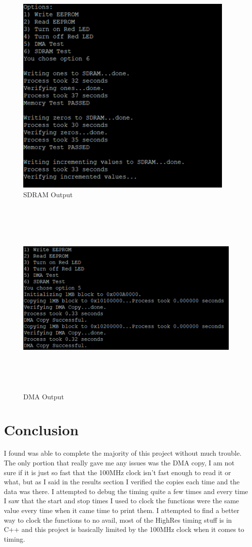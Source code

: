 \documentclass[10pt,a4paper]{article}
\begin{document}
	\begin{figure}[H]
		\centering\includegraphics[height=10cm]{SDRAM_output.png}
		\caption{SDRAM Output}
		\label{SDRAM}
	\end{figure}
	\begin{figure}[H]
		\centering\includegraphics[height=10cm]{DMA_output.png}
		\caption{DMA Output}
		\label{DMA}
	\end{figure}
	\section{Conclusion}
	I found was able to complete the majority of this project without much trouble. The only portion that really gave me any issues was the DMA copy, I am not sure if it is just so fast that the 100MHz clock isn't fast enough to read it or what, but as I said in the results section I verified the copies each time and the data was there. I attempted to debug the timing quite a few times and every time I saw that the start and stop times I used to clock the functions were the same value every time when it came time to print them. I attempted to find a better way to clock the functions to no avail, most of the HighRes timing stuff is in C++ and this project is basically limited by the 100MHz clock when it comes to timing.
	
\end{document}
